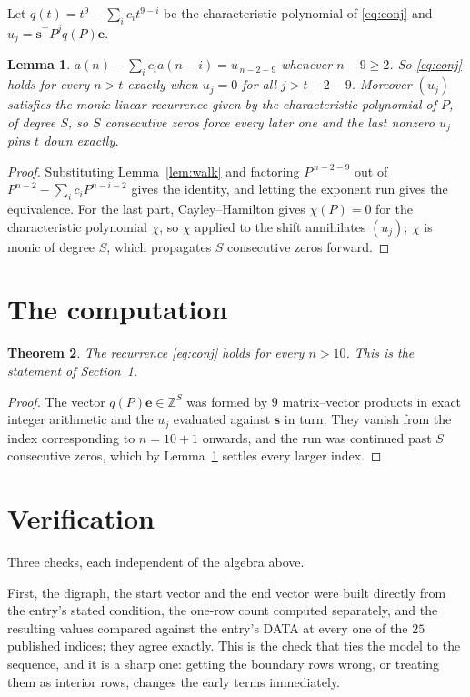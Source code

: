 \documentclass[11pt,a4paper]{article}
\theoremstyle{plain}
\newtheorem{theorem}{Theorem}
\newtheorem{lemma}[theorem]{Lemma}
\theoremstyle{definition}
\begin{document}
Let $q(t)=t^{9}-\sum_i c_i t^{9-i}$ be the characteristic polynomial of
\eqref{eq:conj} and $u_j=\mathbf{s}^{\!\top}P^{j}q(P)\mathbf{e}$.

\begin{lemma}\label{lem:crit}
$a(n)-\sum_i c_i a(n-i)=u_{\,n-2-9}$ whenever $n-9\ge2$. So \eqref{eq:conj}
holds for every $n>t$ exactly when $u_j=0$ for all $j>t-2-9$. Moreover $(u_j)$
satisfies the monic linear recurrence given by the characteristic polynomial of $P$, of
degree $S$, so $S$ consecutive zeros force every later one and the last nonzero $u_j$ pins
$t$ down exactly.
\end{lemma}

\begin{proof}
Substituting Lemma~\ref{lem:walk} and factoring $P^{\,n-2-9}$ out of
$P^{n-2}-\sum_i c_i P^{n-i-2}$ gives the identity, and letting the exponent run gives the
equivalence. For the last part, Cayley--Hamilton gives $\chi(P)=0$ for the characteristic
polynomial $\chi$, so $\chi$ applied to the shift annihilates $(u_j)$; $\chi$ is monic of
degree $S$, which propagates $S$ consecutive zeros forward.
\end{proof}

\section{The computation}

\begin{theorem}
The recurrence \eqref{eq:conj} holds for every $n>10$. This is the statement of
Section~1.
\end{theorem}

\begin{proof}
The vector $q(P)\mathbf{e}\in\mathbb{Z}^{S}$ was formed by $9$ matrix--vector
products in exact integer arithmetic and the $u_j$ evaluated against $\mathbf{s}$ in turn.
They vanish from the index corresponding to $n=10+1$ onwards, and the run was continued
past $S$ consecutive zeros, which by Lemma~\ref{lem:crit} settles every larger index.
\end{proof}

\section{Verification}

Three checks, each independent of the algebra above.

First, the digraph, the start vector and the end vector were built directly from the
entry's stated condition, the one-row count computed separately, and the resulting values
compared against the entry's DATA at every one of the $25$ published indices; they
agree exactly. This is the check that ties the model to the sequence, and it is a sharp one:
getting the boundary rows wrong, or treating them as interior rows, changes the early terms
immediately.
\end{document}
